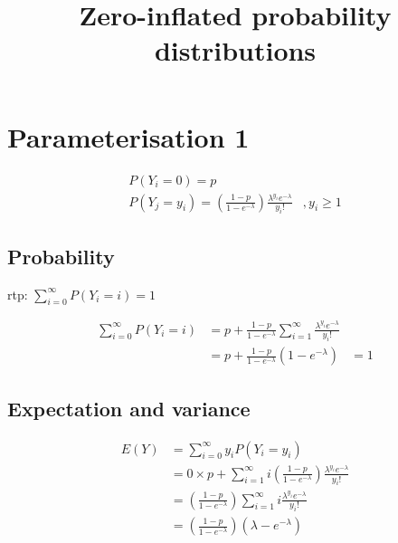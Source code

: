 \documentclass{amsart}
\title{Zero-inflated probability distributions}
\begin{document}
\maketitle

\section{Parameterisation 1}

\begin{equation*}
\begin{array}{ll}
P(Y_i = 0) = p & \\
P(Y_j = y_i) = \left (\frac{1 - p}{1 - e^{-\lambda}}\right ) \frac{\lambda^{y_i} e^{-\lambda}}{y_i !} &, y_i \geq 1
\end{array}
\end{equation*}

\subsection{Probability}
rtp: $\sum_{i=0}^{\infty} P(Y_i = i) = 1$

\begin{equation*}
\begin{array}{lll}
\sum_{i=0}^{\infty} P(Y_i = i) &= p + \frac{1-p}{1 - e^{-\lambda}} \sum_{i=1}^{\infty} \frac{\lambda^{y_i} e^{-\lambda}}{y_i !} & \\
&= p + \frac{1 - p}{1 - e^{-\lambda}} (1 - e^{-\lambda}) &= 1
\end{array}
\end{equation*}

\subsection{Expectation and variance}
\begin{equation*}
\begin{array}{ll}
E(Y) &= \sum_{i=0}^{\infty} y_i P(Y_i = y_i) \\
&= 0 \times p + \sum_{i=1}^{\infty} i \left( \frac{1 - p}{1 - e^{-\lambda}} \right) \frac{\lambda^{y_i} e^{-\lambda}}{y_i !} \\
&= \left( \frac{1 - p}{1 - e^{-\lambda}} \right) \sum_{i=1}^{\infty} i \frac{\lambda^{y_i} e^{-\lambda}}{y_i !} \\
&= \left( \frac{1 - p}{1 - e^{-\lambda}} \right) (\lambda - e^{-\lambda})
\end{array}
\end{equation*}
\end{document}
